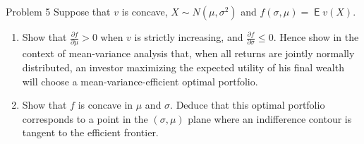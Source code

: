 \documentclass[10pt,handout]{beamer}
\newcommand{\ds}{\displaystyle}
\DeclareMathOperator\expc{\mathsf{E}}
\theoremstyle{definition}
\begin{document}
\begin{frame}[allowframebreaks]
\begin{enumerate}
  \end{enumerate}
\end{frame}

\begin{frame}{Problem 5}
  Suppose that $v$ is concave, $X\sim N(\mu,\sigma^2)$ and $f(\sigma, \mu) = \expc v(X)$.
  \begin{enumerate}
    \item Show that $\ds\frac{\partial f}{\partial\mu} > 0$ when $v$ is strictly increasing, and $\ds\frac{\partial f}{\partial\sigma}\leqslant 0$. Hence show in the context of mean-variance analysis that, when all returns are jointly normally distributed, an investor maximizing the expected utility of his final wealth will choose a mean-variance-efficient optimal portfolio.
    \item Show that $f$ is concave in $\mu$ and $\sigma$. Deduce that this optimal portfolio corresponds to a point in the $(\sigma,\mu)$ plane where an indifference contour is tangent to the efficient frontier.
  \end{enumerate}
\end{frame}
\end{document}
